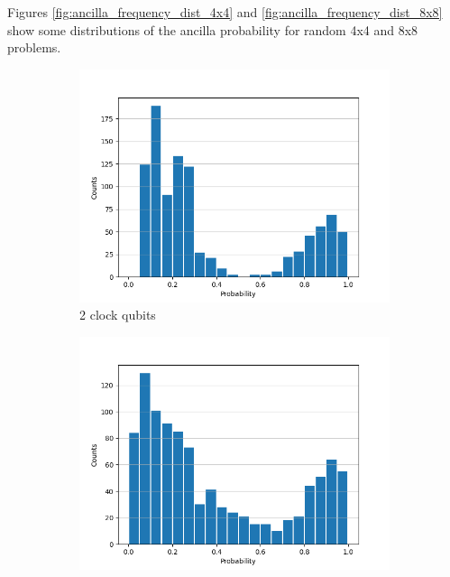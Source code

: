 \documentclass[12pt]{extarticle}
\begin{document}
Figures \ref{fig:ancilla_frequency_dist_4x4} and \ref{fig:ancilla_frequency_dist_8x8} show some distributions of the ancilla probability for random 4x4 and 8x8 problems.

\begin{figure}[htbp]
    \centering
    \captionsetup[subfigure]{labelformat=empty}
    \begin{subfigure}[b]{0.45\textwidth}
        \centering
        \includegraphics[width=\textwidth]{images/ancilla_frequency_dist_4x4b3.png}
        \caption{2 clock qubits}
    \end{subfigure}
    \hfill
    \begin{subfigure}[b]{0.45\textwidth}
        \centering
        \includegraphics[width=\textwidth]{images/ancilla_frequency_dist_4x4b4.png}

\end{subfigure}
\end{figure}
\end{document}
